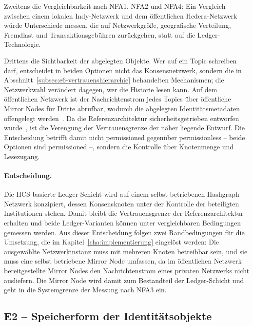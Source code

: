Zweitens die Vergleichbarkeit nach NFA1, NFA2 und NFA4: Ein Vergleich zwischen einem lokalen Indy-Netzwerk und dem öffentlichen Hedera-Netzwerk würde Unterschiede messen, die auf Netzwerkgröße, geografische Verteilung, Fremdlast und Transaktionsgebühren zurückgehen, statt auf die Ledger-Technologie.

Drittens die Sichtbarkeit der abgelegten Objekte. Wer auf ein Topic schreiben darf, entscheidet in beiden Optionen nicht das Konsensnetzwerk, sondern die in Abschnitt~\ref{subsec:e6-vertrauenshierarchie} behandelten Mechanismen; die Netzwerkwahl verändert dagegen, wer die Historie lesen kann. Auf dem öffentlichen Netzwerk ist der Nachrichtenstrom jedes Topics über öffentliche Mirror Nodes für Dritte abrufbar, wodurch die abgelegten Identitätsmetadaten offengelegt werden~\cite{satybaldy2026}. Da die Referenzarchitektur sicherheitsgetrieben entworfen wurde~\cite{erler2023}, ist die Verengung der Vertrauensgrenze der näher liegende Entwurf. Die Entscheidung betrifft damit nicht permissioned gegenüber permissionless -- beide Optionen sind permissioned --, sondern die Kontrolle über Knotenmenge und Lesezugang.

\paragraph{Entscheidung.}
Die HCS-basierte Ledger-Schicht wird auf einem selbst betriebenen Hashgraph-Netzwerk konzipiert, dessen Konsensknoten unter der Kontrolle der beteiligten Institutionen stehen. Damit bleibt die Vertrauensgrenze der Referenzarchitektur erhalten und beide Ledger-Varianten können unter vergleichbaren Bedingungen gemessen werden. Aus dieser Entscheidung folgen zwei Randbedingungen für die Umsetzung, die im Kapitel~\ref{cha:implementierung} eingelöst werden: Die ausgewählte Netzwerkinstanz muss mit mehreren Knoten betreibbar sein, und sie muss eine selbst betriebene Mirror Node umfassen, da im öffentlichen Netzwerk bereitgestellte Mirror Nodes den Nachrichtenstrom eines privaten Netzwerks nicht ausliefern. Die Mirror Node wird damit zum Bestandteil der Ledger-Schicht und geht in die Systemgrenze der Messung nach NFA3 ein.


\subsection{E2 -- Speicherform der Identitätsobjekte}
\label{subsec:e2-speicherform}

